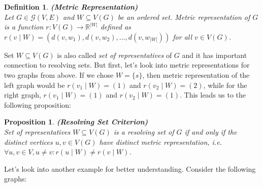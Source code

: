 \documentclass[12pt]{amsart}
\theoremstyle{plain}
\newtheorem*{proposition}{Proposition}
\newtheorem*{definition}{Definition}
\begin{document}
\vspace{-0.2cm}

\begin{definition} \textbf{(Metric Representation)} \\[1pt]
  Let $G \in \mathcal{G}(V, E)$ and $W \subseteq V(G)$ be an ordered set. \textit{Metric representation} of $G$ is a function $r: V(G) \rightarrow \mathbb{R}^{|W|}$ defined as $r(v \mid W) = (d(v, w_1), d(v, w_2), \ldots, d(v, w_{|W|}))$ for all $v \in V(G)$.
\end{definition}

\vspace{-0.2cm}

Set $W \subseteq V(G)$ is also called \textit{set of representatives} of $G$ and it has important connection to resolving sets. But first, let's look into metric representations for two graphs from above. If we chose $W = \{s\}$, then metric representation of the left graph would be $r(v_1 \mid W) = (1)$ and $r(v_2 \mid W) = (2)$, while for the right graph, $r(v_1 \mid W) = (1)$ and $r(v_2 \mid W) = (1)$. This leads us to the following proposition:

\newpage

\begin{proposition} \textbf{(Resolving Set Criterion)} \\
  Set of representatives $W \subseteq V(G)$ is a resolving set of $G$ if and only if the distinct vertices $u, v \in V(G)$ have distinct metric representation, i.e. $\forall u,v \in V, u \neq v : r(u \mid W) \neq r(v \mid W)$.
\end{proposition}

\vspace{-0.2cm}

Let's look into another example for better understanding. Consider the following graphs:

\vspace{-0.4cm}
\end{document}

